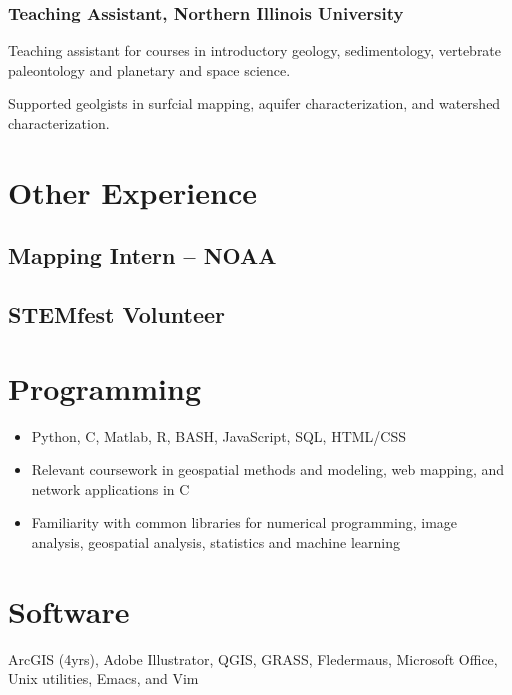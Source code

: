 \documentclass{cv_TOH}
\begin{document}
\subsubsection{Teaching Assistant, Northern Illinois University}
Teaching assistant for courses in introductory geology, sedimentology, vertebrate paleontology and planetary and space science.


Supported geolgists in surfcial mapping, aquifer characterization, and watershed characterization.

\section{Other Experience}
\subsection{Mapping Intern -- NOAA}
\subsection{STEMfest Volunteer}

\section{Programming}
\begin{itemize}
\item Python, C, Matlab, R, BASH, JavaScript, SQL, HTML/CSS
\item Relevant coursework in geospatial methods and modeling, web mapping, and network applications in C
\item Familiarity with common libraries for numerical programming, image analysis, geospatial analysis, statistics and machine learning
\end{itemize}

\section{Software}
ArcGIS (4yrs), Adobe Illustrator, QGIS, GRASS, Fledermaus, Microsoft Office, Unix utilities, Emacs, and Vim
\end{document}
